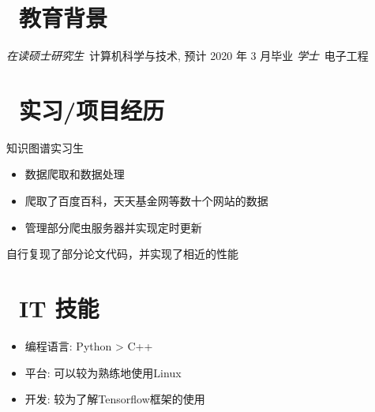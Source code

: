 \documentclass{resume}
\begin{document}


 
\section{\faGraduationCap\  教育背景}
\textit{在读硕士研究生}\ 计算机科学与技术, 预计 2020 年 3 月毕业
\textit{学士}\ 电子工程

\section{\faUsers\ 实习/项目经历}
\role{实习}
知识图谱实习生
\begin{itemize}
  \item 数据爬取和数据处理
  \item 爬取了百度百科，天天基金网等数十个网站的数据
  \item 管理部分爬虫服务器并实现定时更新
\end{itemize}

\begin{onehalfspacing}
自行复现了部分论文代码，并实现了相近的性能
\end{onehalfspacing}


\section{\faCogs\ IT 技能}
\begin{itemize}[parsep=0.5ex]
  \item 编程语言: Python > C++
  \item 平台: 可以较为熟练地使用Linux
  \item 开发: 较为了解Tensorflow框架的使用
\end{itemize}


%
%
\end{document}
